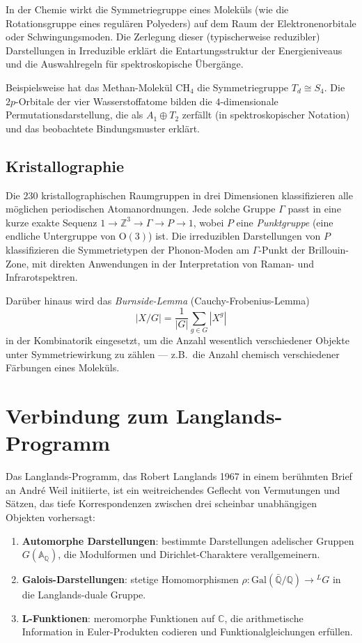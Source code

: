 \documentclass[12pt,a4paper]{amsart}
\theoremstyle{definition}
\begin{document}
In der Chemie wirkt die Symmetriegruppe eines Moleküls (wie die Rotationsgruppe
eines regulären Polyeders) auf dem Raum der Elektronenorbitale oder
Schwingungsmoden.  Die Zerlegung dieser (typischerweise reduzibler) Darstellungen
in Irreduzible erklärt die Entartungsstruktur der Energieniveaus und die
Auswahlregeln für spektroskopische Übergänge.

Beispielsweise hat das Methan-Molekül $\mathrm{CH}_4$ die Symmetriegruppe
$T_d \cong S_4$.  Die $2p$-Orbitale der vier Wasserstoffatome bilden die
$4$-dimensionale Permutationsdarstellung, die als $A_1 \oplus T_2$ zerfällt
(in spektroskopischer Notation) und das beobachtete Bindungsmuster erklärt.

\subsection{Kristallographie}

Die $230$ kristallographischen Raumgruppen in drei Dimensionen klassifizieren alle
möglichen periodischen Atomanordnungen.  Jede solche Gruppe $\Gamma$ passt in eine
kurze exakte Sequenz $1 \to \mathbb{Z}^3 \to \Gamma \to P \to 1$, wobei $P$ eine
\emph{Punktgruppe} (eine endliche Untergruppe von $\mathrm{O}(3)$) ist.  Die
irreduziblen Darstellungen von $P$ klassifizieren die Symmetrietypen der
Phonon-Moden am $\Gamma$-Punkt der Brillouin-Zone, mit direkten Anwendungen
in der Interpretation von Raman- und Infrarotspektren.

Darüber hinaus wird das \emph{Burnside-Lemma} (Cauchy-Frobenius-Lemma)
\[
    |X/G| = \frac{1}{|G|} \sum_{g \in G} |X^g|
\]
in der Kombinatorik eingesetzt, um die Anzahl wesentlich verschiedener Objekte
unter Symmetriewirkung zu zählen --- z.B.\ die Anzahl chemisch verschiedener
Färbungen eines Moleküls.

\section{Verbindung zum Langlands-Programm}
\label{sec:langlands}

Das Langlands-Programm, das Robert Langlands 1967 in einem berühmten Brief an
André Weil initiierte, ist ein weitreichendes Geflecht von Vermutungen und Sätzen,
das tiefe Korrespondenzen zwischen drei scheinbar unabhängigen Objekten vorhersagt:
\begin{enumerate}
  \item \textbf{Automorphe Darstellungen}: bestimmte Darstellungen adelischer
        Gruppen $G(\mathbb{A}_{\mathbb{Q}})$, die Modulformen und Dirichlet-Charaktere
        verallgemeinern.
  \item \textbf{Galois-Darstellungen}: stetige Homomorphismen $\rho \colon
        \mathrm{Gal}(\bar{\mathbb{Q}}/\mathbb{Q}) \to {}^L G$ in die
        Langlands-duale Gruppe.
  \item \textbf{L-Funktionen}: meromorphe Funktionen auf $\mathbb{C}$, die
        arithmetische Information in Euler-Produkten codieren und
        Funktionalgleichungen erfüllen.
\end{enumerate}
\end{document}
